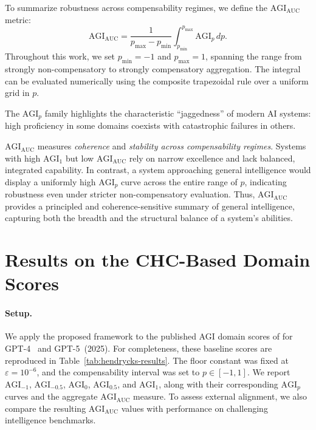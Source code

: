 \documentclass{article}
\begin{document}
To summarize robustness across compensability regimes, we define the $\mathrm{AGI}_{\mathrm{AUC}}$ metric:
\begin{equation}
\mathrm{AGI}_{\mathrm{AUC}}
=
\frac{1}{p_{\max}-p_{\min}}
\int_{p_{\min}}^{p_{\max}}
\mathrm{AGI}_p \, dp .
\label{eq:agiauc}
\end{equation}
Throughout this work, we set $p_{\min}=-1$ and $p_{\max}=1$, spanning the range from strongly non-compensatory to strongly compensatory aggregation. The integral can be evaluated numerically using the composite trapezoidal rule over a uniform grid in $p$.

The $\mathrm{AGI}_p$ family highlights the characteristic ``jaggedness'' of modern AI systems: high proficiency in some domains coexists with catastrophic failures in others. 

$\mathrm{AGI}_{\mathrm{AUC}}$ measures \emph{coherence} and \emph{stability across compensability regimes}. Systems with high $\mathrm{AGI}_1$ but low $\mathrm{AGI}_{\mathrm{AUC}}$ rely on narrow excellence and lack balanced, integrated capability. In contrast, a system approaching general intelligence would display a uniformly high $\mathrm{AGI}_p$ curve across the entire range of $p$, indicating robustness even under stricter non-compensatory evaluation. Thus, $\mathrm{AGI}_{\mathrm{AUC}}$ provides a principled and coherence-sensitive summary of general intelligence, capturing both the breadth and the structural balance of a system's abilities.




\section{Results on the CHC-Based Domain Scores}
\label{results_chc}


\paragraph{Setup.}
We apply the proposed framework to the published AGI domain scores of \citet{hendrycks2025agidefinition} for GPT-4~\citep{achiam2023gpt} and GPT-5~(2025).  
For completeness, these baseline scores are reproduced in Table~\ref{tab:hendrycks-results}.  
The floor constant was fixed at $\varepsilon = 10^{-6}$, and the compensability interval was set to $p \in [-1,1]$.  
We report $\mathrm{AGI}_{-1}$, $\mathrm{AGI}_{-0.5}$, $\mathrm{AGI}_0$, $\mathrm{AGI}_{0.5}$, and $\mathrm{AGI}_1$, along with their corresponding $\mathrm{AGI}_p$ curves and the aggregate $\mathrm{AGI}_{\mathrm{AUC}}$ measure. To assess external alignment, we also compare the resulting $\mathrm{AGI}_{\mathrm{AUC}}$ values with performance on challenging intelligence benchmarks.
\end{document}
